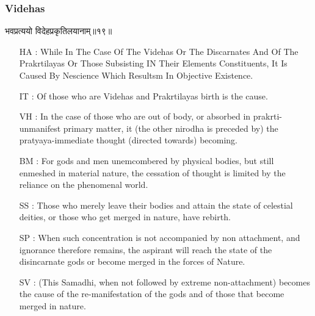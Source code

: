 \begin{frame}[fragile]\frametitle{Videhas}
\begin{sanskrit}
भवप्रत्ययो विदेहप्रकृतिलयानाम्॥१९॥
\end{sanskrit}

	\begin{itemize}
	\item [HA]: While In The Case Of The Videhas Or The Discarnates And Of The Prakrtilayas Or Those Subsisting IN Their Elements Constituents, It Is Caused By Nescience Which Resultsm In Objective Existence.
	\item [IT]: Of those who are Videhas and Prakrtilayas birth is the cause.
	\item [VH]: In the case of those who are out of body, or absorbed in prakrti-unmanifest primary matter, it (the other nirodha is preceded by) the pratyaya-immediate thought (directed towards) becoming.
	\item [BM]: For gods and men unemcombered by physical bodies, but still enmeshed in material nature, the cessation of thought is limited by the reliance on the phenomenal world.
	\item [SS]: Those who merely leave their bodies and attain the state of celestial deities, or those who get merged in nature, have rebirth.
	\item [SP]: When such concentration is not accompanied by non attachment, and ignorance therefore remains, the aspirant will reach the state of the disincarnate gods or become merged in the forces of Nature.
	\item [SV]: (This Samadhi, when not followed by extreme non-attachment) becomes the cause of the re-manifestation of the gods and of those that become merged in nature. 
	\end{itemize}
\end{frame}

